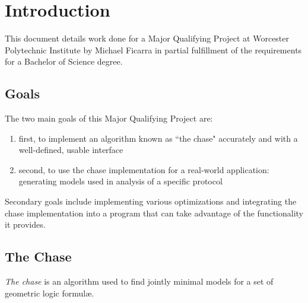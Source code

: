 \section{Introduction}

	This document details work done for a Major Qualifying Project at Worcester
	Polytechnic Institute by Michael Ficarra in partial fulfillment of the
	requirements for a Bachelor of Science degree.

	\subsection{Goals}

		The two main goals of this Major Qualifying Project are:

		\begin{enumerate}
		\item first, to implement an algorithm known as ``the chase" accurately
		and with a well-defined, usable interface
		\item second, to use the chase implementation for a real-world
		application: generating models used in analysis of a specific protocol
		\end{enumerate}

		Secondary goals include implementing various optimizations and
		integrating the chase implementation into a program that can take
		advantage of the functionality it provides.

	\subsection{The Chase}

		\emph{The chase} is an algorithm used to find jointly minimal models
		for a set of geometric logic formul{\ae}.
